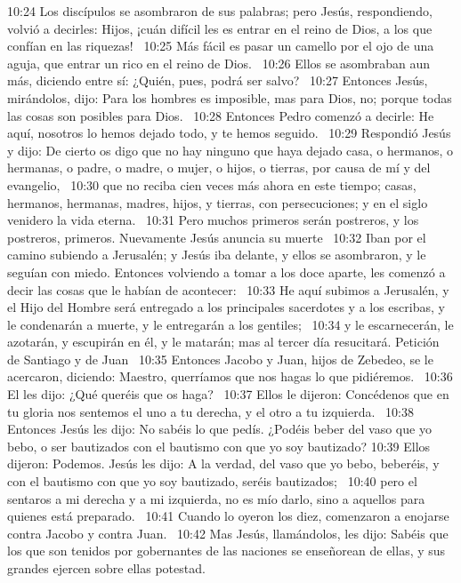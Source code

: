 10:24 Los discípulos se asombraron de sus palabras; pero Jesús, respondiendo, volvió a decirles: Hijos, ¡cuán difícil les es entrar en el reino de Dios, a los que confían en las riquezas!  
10:25 Más fácil es pasar un camello por el ojo de una aguja, que entrar un rico en el reino de Dios.  
10:26 Ellos se asombraban aun más, diciendo entre sí: ¿Quién, pues, podrá ser salvo?  
10:27 Entonces Jesús, mirándolos, dijo: Para los hombres es imposible, mas para Dios, no; porque todas las cosas son posibles para Dios.  
10:28 Entonces Pedro comenzó a decirle: He aquí, nosotros lo hemos dejado todo, y te hemos seguido.  
10:29 Respondió Jesús y dijo: De cierto os digo que no hay ninguno que haya dejado casa, o hermanos, o hermanas, o padre, o madre, o mujer, o hijos, o tierras, por causa de mí y del evangelio,  
10:30 que no reciba cien veces más ahora en este tiempo; casas, hermanos, hermanas, madres, hijos, y tierras, con persecuciones; y en el siglo venidero la vida eterna.  
10:31 Pero muchos primeros serán postreros, y los postreros, primeros. 
Nuevamente Jesús anuncia su muerte   
10:32 Iban por el camino subiendo a Jerusalén; y Jesús iba delante, y ellos se asombraron, y le seguían con miedo. Entonces volviendo a tomar a los doce aparte, les comenzó a decir las cosas que le habían de acontecer:  
10:33 He aquí subimos a Jerusalén, y el Hijo del Hombre será entregado a los principales sacerdotes y a los escribas, y le condenarán a muerte, y le entregarán a los gentiles;  
10:34 y le escarnecerán, le azotarán, y escupirán en él, y le matarán; mas al tercer día resucitará. 
Petición de Santiago y de Juan   
10:35 Entonces Jacobo y Juan, hijos de Zebedeo, se le acercaron, diciendo: Maestro, querríamos que nos hagas lo que pidiéremos.  
10:36 El les dijo: ¿Qué queréis que os haga?  
10:37 Ellos le dijeron: Concédenos que en tu gloria nos sentemos el uno a tu derecha, y el otro a tu izquierda.  
10:38 Entonces Jesús les dijo: No sabéis lo que pedís. ¿Podéis beber del vaso que yo bebo, o ser bautizados con el bautismo con que yo soy bautizado? 
10:39 Ellos dijeron: Podemos. Jesús les dijo: A la verdad, del vaso que yo bebo, beberéis, y con el bautismo con que yo soy bautizado, seréis bautizados;  
10:40 pero el sentaros a mi derecha y a mi izquierda, no es mío darlo, sino a aquellos para quienes está preparado.  
10:41 Cuando lo oyeron los diez, comenzaron a enojarse contra Jacobo y contra Juan.  
10:42 Mas Jesús, llamándolos, les dijo: Sabéis que los que son tenidos por gobernantes de las naciones se enseñorean de ellas, y sus grandes ejercen sobre ellas potestad.  
